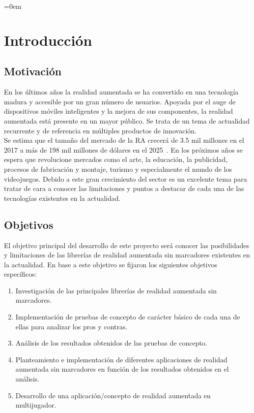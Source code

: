 \parindent=0em
\chapter{Introducción}
\noindent
\section{Motivación}

En los últimos años la realidad aumentada se ha convertido en una tecnología madura y accesible por un gran número de usuarios. Apoyada por el auge de dispositivos móviles inteligentes y la mejora de sus componentes, la realidad aumentada está presente en un mayor público. Se trata de un tema de actualidad recurrente y de referencia en múltiples productos de innovación.\\

Se estima que el tamaño del mercado de la RA crecerá de 3.5 mil millones en el 2017 a más de 198 mil millones de dólares en el 2025~\cite{Statista}. En los próximos años se espera que revolucione mercados como el arte, la educación, la publicidad, procesos de fabricación y montaje, turismo y especialmente el mundo de los videojuegos. Debido a este gran crecimiento del sector es un excelente tema para tratar de cara a conocer las limitaciones y puntos a destacar de cada una de las tecnologías existentes en la actualidad.

\section{Objetivos}
El objetivo principal del desarrollo de este proyecto será conocer las posibilidades y limitaciones de las librerías de realidad aumentada sin marcadores existentes en la actualidad. En base a este objetivo se fijaron los siguientes objetivos específicos:
\begin{enumerate}[label={\arabic*.}]
\item Investigación de las principales librerías de realidad aumentada sin marcadores.
\item Implementación de pruebas de concepto de carácter básico de cada una de ellas para analizar los pros y contras.
\item Análisis de los resultados obtenidos de las pruebas de concepto.
\item Planteamiento e implementación de diferentes aplicaciones de realidad aumentada sin marcadores en función de los resultados obtenidos en el análisis.
\item Desarrollo de una aplicación/concepto de realidad aumentada en multijugador.
\end{enumerate}
\newpage

